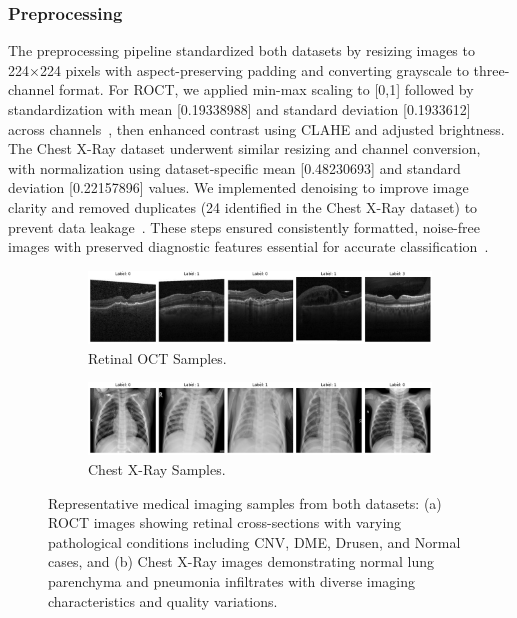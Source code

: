 \documentclass[preprint,12pt]{elsarticle}
\begin{document}
\subsubsection{Preprocessing}
The preprocessing pipeline standardized both datasets by resizing images to 224×224 pixels with aspect-preserving padding and converting grayscale to three-channel format. For ROCT, we applied min-max scaling to [0,1] followed by standardization with mean [0.19338988] and standard deviation [0.1933612] across channels~\cite{Elgendi21}, then enhanced contrast using CLAHE and adjusted brightness. The Chest X-Ray dataset underwent similar resizing and channel conversion, with normalization using dataset-specific mean [0.48230693] and standard deviation [0.22157896] values. We implemented denoising to improve image clarity and removed duplicates (24 identified in the Chest X-Ray dataset) to prevent data leakage~\cite{Khalifa22}. These steps ensured consistently formatted, noise-free images with preserved diagnostic features essential for accurate classification~\cite{Puttagunta21}.

\begin{figure}[!t]
\centering
\begin{subfigure}[b]{\columnwidth}
\centering
\includegraphics[width=0.9\columnwidth]{fig/fig1_a.png}
\caption{Retinal OCT Samples.}
\end{subfigure}
\vspace{0.3cm}
\begin{subfigure}[b]{\columnwidth}
\centering
\includegraphics[width=0.9\columnwidth]{fig/fig1_b.png}
\caption{Chest X-Ray Samples.}
\end{subfigure}
\caption{Representative medical imaging samples from both datasets: (a) ROCT images showing retinal cross-sections with varying pathological conditions including CNV, DME, Drusen, and Normal cases, and (b) Chest X-Ray images demonstrating normal lung parenchyma and pneumonia infiltrates with diverse imaging characteristics and quality variations.}
\label{fig:dataset_samples}
\end{figure}
\end{document}
